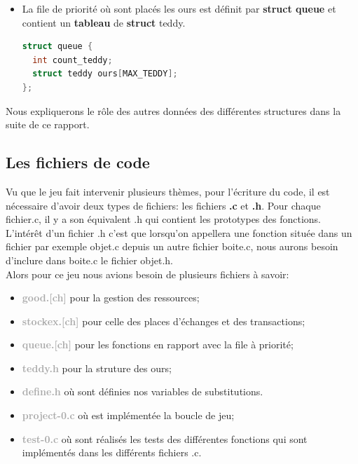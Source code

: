 \documentclass[a4paper,12pt]{article}
\begin{document}
\begin{itemize}
\item La file de priorité où sont placés les ours est définit par \textbf{struct queue} et contient un \textbf{tableau} de \textbf{struct} teddy.
\newpage
\begin{lstlisting}[language={C},captionpos=b, frame=single, caption = Structure Queue]
struct queue {
  int count_teddy;
  struct teddy ours[MAX_TEDDY];
};
\end{lstlisting}

\end{itemize}
Nous expliquerons le rôle des autres données des différentes structures dans la suite de ce rapport.

  \subsection{Les fichiers de code}

Vu que le jeu fait intervenir plusieurs thèmes, pour l'écriture du code, il est nécessaire d'avoir deux types de fichiers: les fichiers \textbf{.c} et \textbf{.h}. Pour chaque fichier.c, il y a son équivalent .h qui contient les prototypes des fonctions. L'intérêt d'un fichier .h c'est que lorsqu'on appellera une fonction située dans un fichier par exemple objet.c depuis un autre fichier boite.c, nous aurons besoin d'inclure dans boite.c le fichier objet.h. \\
Alors pour ce jeu nous avions besoin de plusieurs fichiers à savoir:
\newline
\begin{itemize}
\item \textcolor{darkgray}{\textbf{good.[ch]}} pour la gestion des ressources;
\item \textcolor{darkgray}{\textbf{stockex.[ch]}} pour celle des places d'échanges et des transactions;
\item \textcolor{darkgray}{\textbf{queue.[ch]}} pour les fonctions en rapport avec la file à priorité;
\item \textcolor{darkgray}{\textbf{teddy.h}} pour la struture des ours;
\item \textcolor{darkgray}{\textbf{define.h}} où sont définies nos variables de substitutions.
\item \textcolor{darkgray}{\textbf{project-0.c}} où est implémentée la boucle de jeu;
\item \textcolor{darkgray}{\textbf{test-0.c}} où sont réalisés les tests des différentes fonctions qui sont implémentés dans les différents fichiers .c.
\end{itemize}
\end{document}
